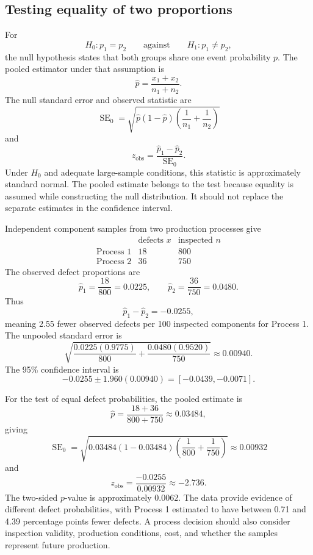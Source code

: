 \subsection{Testing equality of two proportions}

For
\[
H_0:p_1=p_2
\qquad\text{against}\qquad
H_1:p_1\neq p_2,
\]
the null hypothesis states that both groups share one event probability $p$. The pooled estimator under that assumption is
\[
\widehat p
=
\frac{x_1+x_2}{n_1+n_2}.
\]
The null standard error and observed statistic are
\[
\operatorname{SE}_0
=
\sqrt{
\widehat p(1-\widehat p)
\left(\frac{1}{n_1}+\frac{1}{n_2}\right)
}
\]
and
\[
z_{\mathrm{obs}}
=
\frac{\widehat p_1-\widehat p_2}
{\operatorname{SE}_0}.
\]
Under $H_0$ and adequate large-sample conditions, this statistic is approximately standard normal. The pooled estimate belongs to the test because equality is assumed while constructing the null distribution. It should not replace the separate estimates in the confidence interval.

\begin{example}\par
Independent component samples from two production processes give
\[
\begin{array}{c|cc}
& \text{defects }x & \text{inspected }n\\
\hline
\text{Process 1} & 18 & 800\\
\text{Process 2} & 36 & 750
\end{array}
\]
The observed defect proportions are
\[
\widehat p_1=\frac{18}{800}=0.0225,
\qquad
\widehat p_2=\frac{36}{750}=0.0480.
\]
Thus
\[
\widehat p_1-\widehat p_2=-0.0255,
\]
meaning 2.55 fewer observed defects per 100 inspected components for Process 1. The unpooled standard error is
\[
\sqrt{
\frac{0.0225(0.9775)}{800}
+
\frac{0.0480(0.9520)}{750}
}
\approx0.00940.
\]
The 95\% confidence interval is
\[
-0.0255\pm1.960(0.00940)
=[-0.0439,-0.0071].
\]

For the test of equal defect probabilities, the pooled estimate is
\[
\widehat p
=\frac{18+36}{800+750}
\approx0.03484,
\]
giving
\[
\operatorname{SE}_0
=\sqrt{0.03484(1-0.03484)
\left(\frac{1}{800}+\frac{1}{750}\right)}
\approx0.00932
\]
and
\[
z_{\mathrm{obs}}
=\frac{-0.0255}{0.00932}
\approx-2.736.
\]
The two-sided $p$-value is approximately $0.0062$. The data provide evidence of different defect probabilities, with Process 1 estimated to have between 0.71 and 4.39 percentage points fewer defects. A process decision should also consider inspection validity, production conditions, cost, and whether the samples represent future production.
\end{example}

